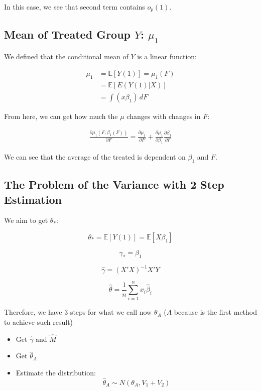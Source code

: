 \documentclass{article}
\begin{document}
In this case, we see that second term contains $o_p(1)$.

\subsection{Mean of Treated Group $Y$: $\mu_1$}

We defined that the conditional mean of $Y$ is a linear function:

\begin{align*}
    \mu_1 &= \mathbb{E}[Y(1)] = \mu_1(F) \\
    &= \mathbb{E}[E(Y(1)| X)] \\
    &= \int (x \beta_1) \, dF
\end{align*}

From here, we can get how much the $\mu$ changes with changes in $F$:

\begin{align*}
    \frac{\partial \mu_1 (F, \beta_1 (F))}{\partial F}
    = \frac{\partial \mu_1}{\partial F} +
    \frac{\partial \mu_1}{\partial \beta_1}
    \frac{\partial \beta_1}{\partial F}
\end{align*}

We can see that the average of the treated is dependent on $\beta_1$ and $F$.

\subsection{The Problem of the Variance with 2 Step Estimation}

We aim to get $\theta_{*}$:

$$
\theta_* = \mathbb{E}[Y(1)] = \mathbb{E}[X \beta_1]
$$

$$
\gamma_* = \beta_1
$$

$$
\hat{\gamma} = (X'X)^{-1} X'Y
$$

$$
\hat{\theta} = \frac{1}{n} \sum_{i=1}^{n} x_i \hat{\beta}_i
$$

Therefore, we have 3 steps for what we call now $\theta_A$ ($A$ because is the first method to achieve such result)

\begin{itemize}
    \item Get $\hat{\gamma}$ and $\hat{M}$
    \item Get $\hat{\theta}_A$
    \item Estimate the distribution:
    $$
    \hat{\theta}_A \sim {N} (\theta_A, V_1 + V_2)
    $$
\end{itemize}
\end{document}
